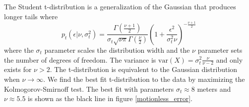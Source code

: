 \documentclass[twocol]{ametsoc}
\begin{document}
The Student t-distribution is a generalization of the Gaussian that produces longer tails where 
\begin{equation}
\label{student_pdf}
p_t\left(\epsilon |\nu,\sigma_t^2\right) = \frac{\Gamma\left( \frac{\nu + 1}{2} \right)}{\sigma_t \sqrt{\nu \pi} \Gamma\left(\frac{\nu}{2}\right)} \left( 1 + \frac{\epsilon^2}{\sigma_t^2 \nu} \right)^{-\frac{\nu+1}{2}}
\end{equation}
where the $\sigma_t$ parameter scales the distribution width and the $\nu$ parameter sets the number of degrees of freedom. The variance is $\textrm{var}(X)=\sigma_t^2 \frac{\nu}{\nu-2}$ and only exists for $\nu > 2$. The t-distribution is equivalent to the Gaussian distribution when $\nu \rightarrow \infty$. We find the best fit t-distribution to the data by maximizing the Kolmogorov-Smirnoff test. The best fit with parameters $\sigma_t \approx 8$ meters and $\nu \approx 5.5$ is shown as the black line in figure \ref{motionless_error}.
\end{document}

